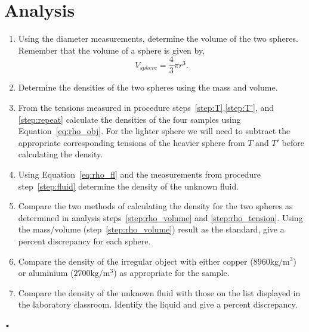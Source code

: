 \documentclass[main.tex]{subfiles}
\begin{document}
\section*{Analysis}
\begin{enumerate}
\item
Using the diameter measurements, determine the volume of the two spheres. Remember that the volume of a sphere is given by,
\[
V_{sphere}=\frac{4}{3}\pi r^3.
\]
\item \label{step:rho_volume}
Determine the densities of the two spheres using the mass and volume.
\item \label{step:rho_tension}
From the tensions measured in procedure steps~\ref{step:T},\ref{step:T'}, and \ref{step:repeat} calculate the densities of the four samples using Equation~\eqref{eq:rho_obj}. For the lighter sphere we will need to subtract the appropriate corresponding tensions of the heavier sphere from $T$ and $T'$ before calculating the density.
\item
Using Equation~\eqref{eq:rho_fl} and the measurements from procedure step~\ref{step:fluid} determine the density of the unknown fluid.
\item
Compare the two methods of calculating the density for the two spheres as determined in analysis steps~\ref{step:rho_volume} and \ref{step:rho_tension}. Using the mass/volume (step~\ref{step:rho_volume}) result as the standard, give a percent discrepancy for each sphere.
\item
Compare the density of the irregular object with either copper ($8960 \text{kg}/\text{m}^3$) or aluminium ($2700 \text{kg}/\text{m}^3$) as appropriate for the sample.
\item
Compare the density of the unknown fluid with those on the list displayed in the laboratory classroom. Identify the liquid and give a percent discrepancy.
\end{enumerate}•
\end{document}
